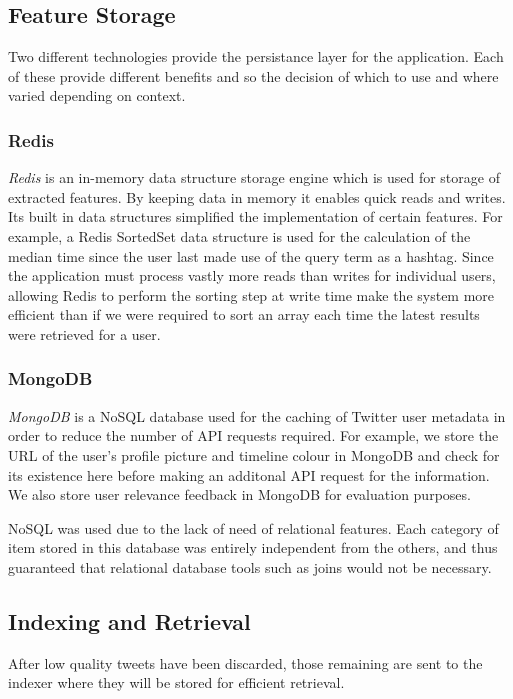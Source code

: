 \documentclass{l4proj}
\begin{document}
        \subsection{Feature Storage}
        
        Two different technologies provide the persistance layer for the application. Each of these provide different benefits and so the decision of which to use and where varied depending on context.
        
        \subsubsection{Redis}
        \textit{Redis} is an in-memory data structure storage engine which is used for storage of extracted features. By keeping data in memory it enables quick reads and writes. Its built in data structures simplified the implementation of certain features. For example, a Redis SortedSet data structure is used for the calculation of the median time since the user last made use of the query term as a hashtag. Since the application must process vastly more reads than writes for individual users, allowing Redis to perform the sorting step at write time make the system more efficient than if we were required to sort an array each time the latest results were retrieved for a user.
        
         \subsubsection{MongoDB}
         \textit{MongoDB} is a NoSQL database used for the caching of Twitter user metadata in order to reduce the number of API requests required. For example, we store the URL of the user's profile picture and timeline colour in MongoDB and check for its existence here before making an additonal API request for the information. We also store user relevance feedback in MongoDB for evaluation purposes.
         
         NoSQL was used due to the lack of need of relational features. Each category of item stored in this database was entirely independent from the others, and thus guaranteed that relational database tools such as joins would not be necessary.


        \subsection{Indexing and Retrieval}
        After low quality tweets have been discarded, those remaining are sent to the indexer where they will be stored for efficient retrieval. 
        
\end{document}
